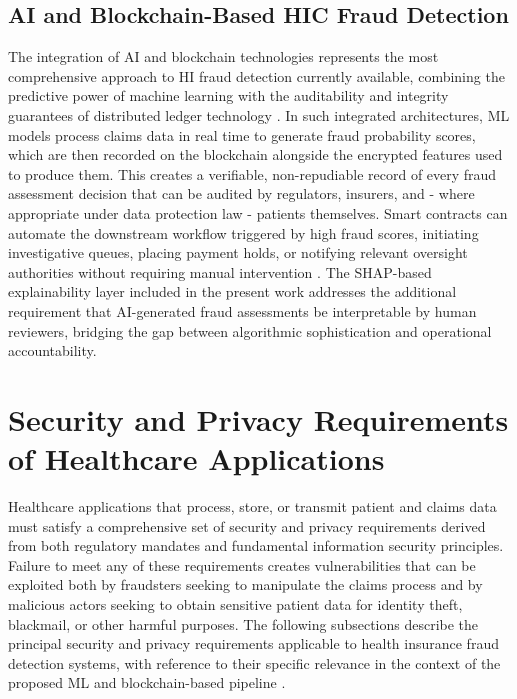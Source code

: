 \subsection{AI and Blockchain-Based HIC Fraud Detection}

The integration of AI and blockchain technologies represents the most comprehensive approach to HI fraud detection currently available, combining the predictive power of machine learning with the auditability and integrity guarantees of distributed ledger technology \cite{li2021}. In such integrated architectures, ML models process claims data in real time to generate fraud probability scores, which are then recorded on the blockchain alongside the encrypted features used to produce them. This creates a verifiable, non-repudiable record of every fraud assessment decision that can be audited by regulators, insurers, and - where appropriate under data protection law - patients themselves. Smart contracts can automate the downstream workflow triggered by high fraud scores, initiating investigative queues, placing payment holds, or notifying relevant oversight authorities without requiring manual intervention \cite{pareek2023}. The SHAP-based explainability layer included in the present work addresses the additional requirement that AI-generated fraud assessments be interpretable by human reviewers, bridging the gap between algorithmic sophistication and operational accountability.

\section{Security and Privacy Requirements of Healthcare Applications}

Healthcare applications that process, store, or transmit patient and claims data must satisfy a comprehensive set of security and privacy requirements derived from both regulatory mandates and fundamental information security principles. Failure to meet any of these requirements creates vulnerabilities that can be exploited both by fraudsters seeking to manipulate the claims process and by malicious actors seeking to obtain sensitive patient data for identity theft, blackmail, or other harmful purposes. The following subsections describe the principal security and privacy requirements applicable to health insurance fraud detection systems, with reference to their specific relevance in the context of the proposed ML and blockchain-based pipeline \cite{zeadally2020,alomar2021}.

